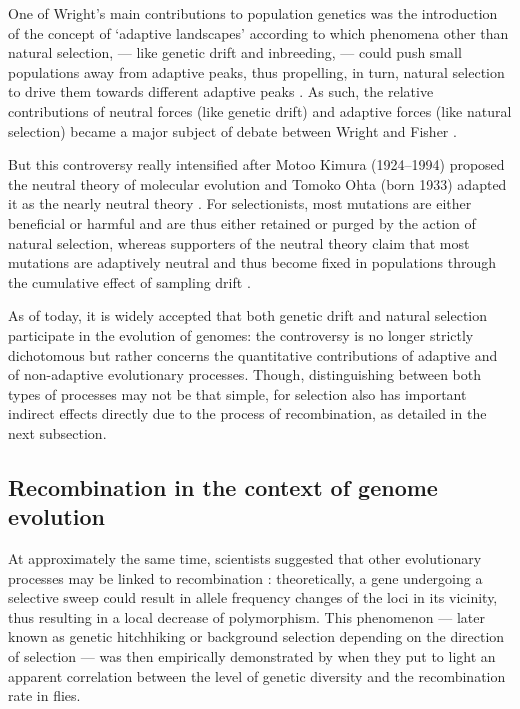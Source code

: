 One of Wright's main contributions to population genetics was the introduction of the concept of ‘adaptive landscapes’ according to which phenomena other than natural selection, — like genetic drift and inbreeding, — could push small populations away from adaptive peaks, thus propelling, in turn, natural selection to drive them towards different adaptive peaks \citep{wright1932roles}.
As such, the relative contributions of neutral forces (like genetic drift) and adaptive forces (like natural selection) became a major subject of debate between Wright and Fisher \citep{plutynski2007drift}.

But this controversy really intensified after Motoo Kimura (1924--1994) proposed the neutral theory of molecular evolution \citep{kimura1968evolutionary,kimura1991neutral,kimura1986dna} and Tomoko Ohta (born 1933) adapted it as the nearly neutral theory \citep{ohta1973slightly}.
For selectionists, most mutations are either beneficial or harmful and are thus either retained or purged by the action of natural selection, whereas supporters of the neutral theory claim that most mutations are adaptively neutral and thus become fixed in populations through the cumulative effect of sampling drift \citep{lewin1996patterns}.

As of today, it is widely accepted that both genetic drift and natural selection participate in the evolution of genomes: the controversy is no longer strictly dichotomous but rather concerns the quantitative contributions of adaptive and of non-adaptive evolutionary processes.
Though, distinguishing between both types of processes may not be that simple, for selection also has important indirect effects directly due to the process of recombination, as detailed in the next subsection.



\subsection{Recombination in the context of genome evolution}

At approximately the same time, scientists suggested that other evolutionary processes may be linked to recombination \citep{maynardsmith1974hitchhiking}: theoretically, a gene undergoing a selective sweep could result in allele frequency changes of the loci in its vicinity, thus resulting in a local decrease of polymorphism.
This phenomenon — later known as genetic hitchhiking or background selection depending on the direction of selection — was then empirically demonstrated by \citet{begun1992levels} when they put to light an apparent correlation between the level of genetic diversity and the recombination rate in flies.

